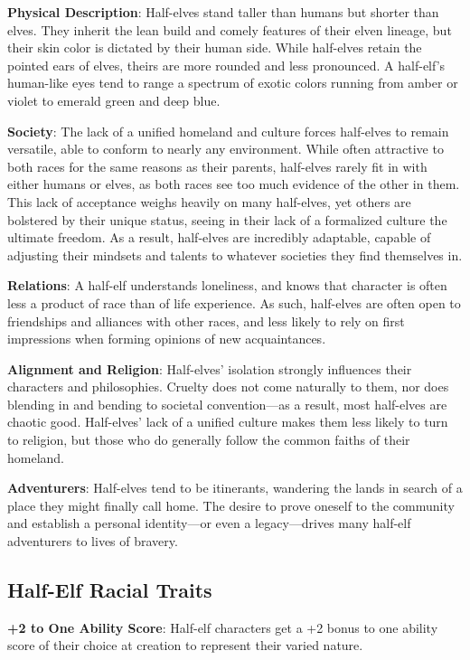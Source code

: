 \textbf{Physical Description}: Half-elves stand taller than humans but shorter than elves. They inherit the lean build and comely features of their elven lineage, but their skin color is dictated by their human side. While half-elves retain the pointed ears of elves, theirs are more rounded and less pronounced. A half-elf's human-like eyes tend to range a spectrum of exotic colors running from amber or violet to emerald green and deep blue.
				
\textbf{Society}: The lack of a unified homeland and culture forces half-elves to remain versatile, able to conform to nearly any environment. While often attractive to both races for the same reasons as their parents, half-elves rarely fit in with either humans or elves, as both races see too much evidence of the other in them. This lack of acceptance weighs heavily on many half-elves, yet others are bolstered by their unique status, seeing in their lack of a formalized culture the ultimate freedom. As a result, half-elves are incredibly adaptable, capable of adjusting their mindsets and talents to whatever societies they find themselves in. 
				
\textbf{Relations}: A half-elf understands loneliness, and knows that character is often less a product of race than of life experience. As such, half-elves are often open to friendships and alliances with other races, and less likely to rely on first impressions when forming opinions of new acquaintances.
				
\textbf{Alignment and Religion}: Half-elves' isolation strongly influences their characters and philosophies. Cruelty does not come naturally to them, nor does blending in and bending to societal convention---as a result, most half-elves are chaotic good. Half-elves' lack of a unified culture makes them less likely to turn to religion, but those who do generally follow the common faiths of their homeland.
				
\textbf{Adventurers}: Half-elves tend to be itinerants, wandering the lands in search of a place they might finally call home. The desire to prove oneself to the community and establish a personal identity---or even a legacy---drives many half-elf adventurers to lives of bravery.
											
\subsection{Half-Elf Racial Traits}

				
\textbf{+2 to One Ability Score}: Half-elf characters get a +2 bonus to one ability score of their choice at creation to represent their varied nature.
				
